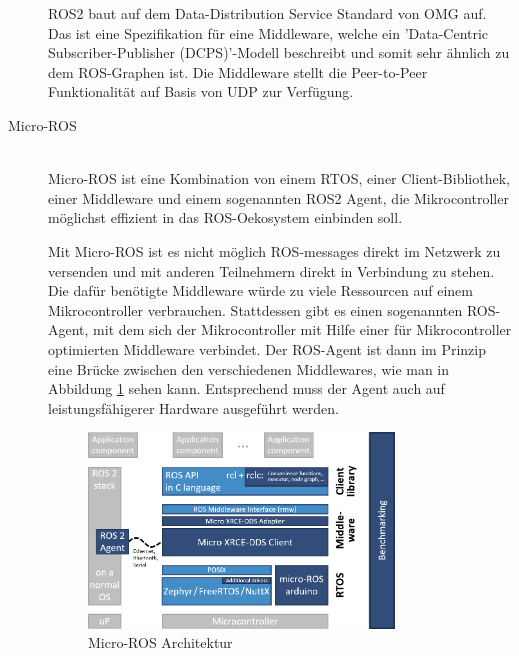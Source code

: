 \begin{flushleft}
\begin{description}
        ROS2 baut auf dem Data-Distribution Service Standard von OMG auf. 
        Das ist eine Spezifikation für eine Middleware, welche ein 'Data-Centric Subscriber-Publisher (DCPS)'-Modell beschreibt und somit sehr ähnlich zu dem ROS-Graphen ist. 
        Die Middleware stellt die Peer-to-Peer Funktionalität auf Basis von UDP zur Verfügung.

        \item[Micro-ROS]\hfill\\
        Micro-ROS ist eine Kombination von einem RTOS, einer Client-Bibliothek, einer Middleware und einem sogenannten ROS2 Agent, 
        die Mikrocontroller möglichst effizient in das ROS-Oekosystem einbinden soll.
        
        Mit Micro-ROS ist es nicht möglich ROS-messages direkt im Netzwerk zu versenden und mit anderen Teilnehmern direkt in Verbindung zu stehen.
        Die dafür benötigte Middleware würde zu viele Ressourcen auf einem Mikrocontroller verbrauchen. 
        Stattdessen gibt es einen sogenannten ROS-Agent, mit dem sich der Mikrocontroller mit Hilfe einer für Mikrocontroller optimierten Middleware verbindet.
        Der ROS-Agent ist dann im Prinzip eine Brücke zwischen den verschiedenen Middlewares, wie man in Abbildung \ref{fig:micro-ros-architecture} sehen kann. Entsprechend muss der Agent auch auf leistungsfähigerer Hardware ausgeführt werden.    
        \cite{micro_ros_concepts}
        \begin{figure}[h!]
            \centering
            \includegraphics[width=0.8\textwidth]{imgs/Grundbegriffe/micro-ROS_architecture.png}
            \caption{Micro-ROS Architektur}
            \label{fig:micro-ros-architecture}%
        \end{figure}
    \end{description}
\end{flushleft}

